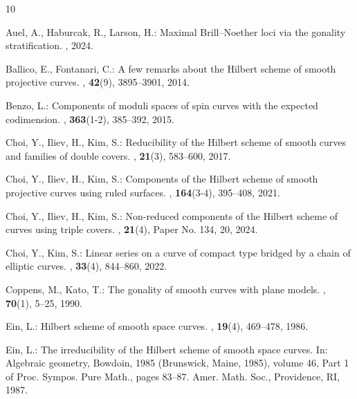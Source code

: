 \documentclass[11pt]{amsart}
\theoremstyle{definition}
\theoremstyle{definition}
\begin{document}
\vspace*{1.5cm}



%
%


\begin{thebibliography}{10}
	
	Auel, A., Haburcak, R., Larson, H.:
	\newblock Maximal {B}rill--{N}oether loci via the gonality stratification.
	, 2024.
	
	Ballico, E., Fontanari, C.:
	\newblock A few remarks about the {H}ilbert scheme of smooth projective curves.
	, \textbf{42}(9), 3895--3901, 2014.
	
	Benzo, L.:
	\newblock Components of moduli spaces of spin curves with the expected
	codimension.
	, \textbf{363}(1-2), 385--392, 2015.
	
	Choi, Y., Iliev, H., Kim, S.:
	\newblock Reducibility of the {H}ilbert scheme of smooth curves and families of
	double covers.
	, \textbf{21}(3), 583--600, 2017.
	
	Choi, Y., Iliev, H., Kim, S.:
	\newblock Components of the {H}ilbert scheme of smooth projective curves using
	ruled surfaces.
	, \textbf{164}(3-4), 395--408, 2021.
	
	Choi, Y., Iliev, H., Kim, S.:
	\newblock Non-reduced components of the {H}ilbert scheme of curves using triple
	covers.
	, \textbf{21}(4), Paper No. 134, 20, 2024.
	
	Choi, Y., Kim, S.:
	\newblock Linear series on a curve of compact type bridged by a chain of
	elliptic curves.
	, \textbf{33}(4), 844--860, 2022.
	
	Coppens, M., Kato, T.:
	\newblock The gonality of smooth curves with plane models.
	, \textbf{70}(1), 5--25, 1990.
	
	Ein, L.:
	\newblock Hilbert scheme of smooth space curves.
	, \textbf{19}(4), 469--478, 1986.
	
	Ein, L.:
	\newblock The irreducibility of the {H}ilbert scheme of smooth space curves.
	\newblock In: {Algebraic geometry, {B}owdoin, 1985 ({B}runswick, {M}aine,
		1985)}, volume 46, Part 1 of {Proc. Sympos. Pure Math.}, pages 83--87.
	Amer. Math. Soc., Providence, RI, 1987.
	

\end{thebibliography}
\end{document}
